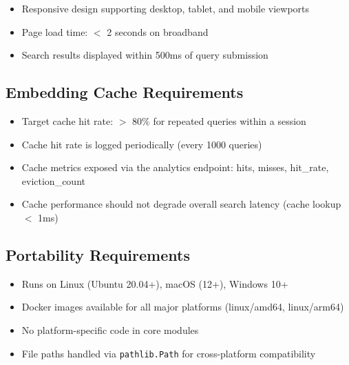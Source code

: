 \documentclass[11pt,a4paper]{article}
\newcommand{\inlinecode}[1]{\texttt{\small\colorbox{ctCodeBg}{#1}}}
\begin{document}
\begin{reqbox}
\begin{itemize}
    \item Responsive design supporting desktop, tablet, and mobile viewports
    \item Page load time: $<$ 2 seconds on broadband
    \item Search results displayed within 500ms of query submission
\end{itemize}
\end{reqbox}

\subsection{Embedding Cache Requirements}

\begin{reqbox}
\begin{itemize}
    \item Target cache hit rate: $>$ 80\% for repeated queries within a session
    \item Cache hit rate is logged periodically (every 1000 queries)
    \item Cache metrics exposed via the analytics endpoint: hits, misses, hit\_rate, eviction\_count
    \item Cache performance should not degrade overall search latency (cache lookup $<$ 1ms)
\end{itemize}
\end{reqbox}

\subsection{Portability Requirements}

\begin{reqbox}
\begin{itemize}
    \item Runs on Linux (Ubuntu 20.04+), macOS (12+), Windows 10+
    \item Docker images available for all major platforms (linux/amd64, linux/arm64)
    \item No platform-specific code in core modules
    \item File paths handled via \inlinecode{pathlib.Path} for cross-platform compatibility
\end{itemize}
\end{reqbox}
\end{document}
